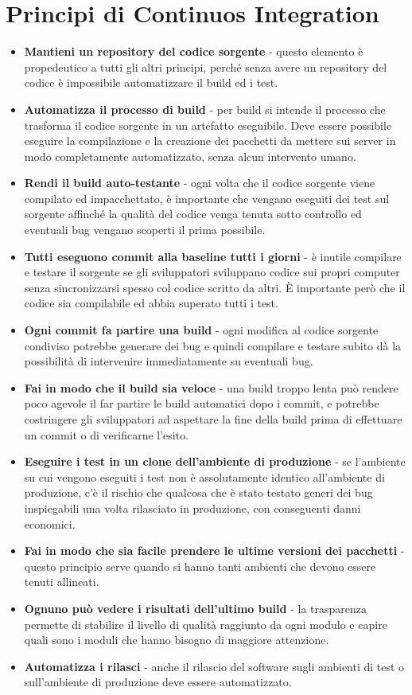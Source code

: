 \documentclass[a4paper,12pt,titlepage,oneside]{book}
\begin{document}
\section{Principi di Continuos Integration}
\begin{itemize}
    \item \textbf{Mantieni un repository del codice sorgente} - questo elemento è propedeutico a tutti gli altri principi, perché senza avere un repository del codice è impossibile automatizzare il build ed i test.
    \item \textbf{Automatizza il processo di build} - per build si intende il processo che trasforma il codice sorgente in un artefatto eseguibile. Deve essere possibile eseguire la compilazione e la creazione dei pacchetti 
        da mettere sui server in modo completamente automatizzato, senza alcun intervento umano.
    \item \textbf{Rendi il build auto-testante} - ogni volta che il codice sorgente viene compilato ed impacchettato, è importante che vengano eseguiti dei test sul sorgente affinché la qualità del codice venga 
        tenuta sotto controllo ed eventuali bug vengano scoperti il prima possibile.
    \item \textbf{Tutti eseguono commit alla baseline tutti i giorni} - è inutile compilare e testare il sorgente se gli sviluppatori sviluppano codice sui propri computer senza sincronizzarsi spesso col codice scritto 
        da altri. È importante però che il codice sia compilabile ed abbia superato tutti i test.
    \item \textbf{Ogni commit fa partire una build} - ogni modifica al codice sorgente condiviso potrebbe generare dei bug e quindi compilare e testare subito dà la possibilità di intervenire immediatamente su eventuali bug.
    \item \textbf{Fai in modo che il build sia veloce} - una build troppo lenta può rendere poco agevole il far partire le build automatici dopo i commit, e potrebbe costringere gli sviluppatori ad aspettare la fine della build 
        prima di effettuare un commit o di verificarne l'esito.
    \item \textbf{Eseguire i test in un clone dell'ambiente di produzione} - se l'ambiente su cui vengono eseguiti i test non è assolutamente identico all'ambiente di produzione, c'è il rischio che qualcosa che è stato testato 
        generi dei bug inspiegabili una volta rilasciato in produzione, con conseguenti danni economici.
    \item \textbf{Fai in modo che sia facile prendere le ultime versioni dei pacchetti} - questo principio serve quando si hanno tanti ambienti che devono essere tenuti allineati.
    \item \textbf{Ognuno può vedere i risultati dell'ultimo build} - la trasparenza permette di stabilire il livello di qualità raggiunto da ogni modulo e capire quali sono i moduli che hanno bisogno di maggiore attenzione.
    \item \textbf{Automatizza i rilasci} - anche il rilascio del software sugli ambienti di test o sull'ambiente di produzione deve essere automatizzato.
\end{itemize}
\end{document}

